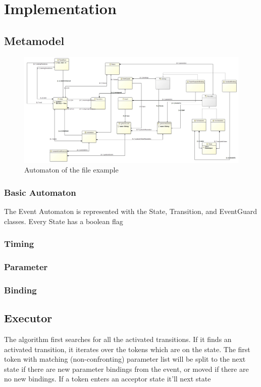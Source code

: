 				
				
	\section{Implementation}
		\subsection{Metamodel}
		
			\begin{figure}[h]
			\centering
			\includegraphics[width=0.9\linewidth]{include/figures/chapter_5/model}
			\caption{Automaton of the file example}
			\label{fig:cep:model}
			\end{figure}
		
			\subsubsection{Basic Automaton}
				The Event Automaton is represented with the State, Transition, and EventGuard classes.
				Every State has a boolean flag 
			\subsubsection{Timing}
			
			\subsubsection{Parameter}
			
			\subsubsection{Binding}
		
		\subsection{Executor}
			The algorithm first searches for all the activated transitions.
			If it finds an activated transition, it iterates over the tokens which are on the state. The first token with matching (non-confronting)
			parameter list will be split to the next state if there are new parameter bindings from the event, or moved if there are no new bindings.
			If a token enters an acceptor state it'll 
			next state 

